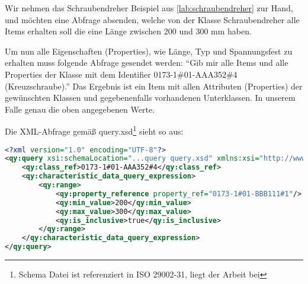 Wir nehmen das Schraubendreher Beispiel aus \autoref{lab:schraubendreher} zur Hand, und möchten eine Abfrage absenden, welche von der Klasse Schraubendreher alle Items erhalten soll die eine Länge zwischen 200 und 300 mm haben. 

Um nun alle Eigenschaften (Properties), wie Länge, Typ und Spannungsfest zu erhalten muss folgende Abfrage gesendet werden: 
\enquote{Gib mir alle Items und alle Properties der Klasse mit dem Identifier 0173-1\#01-AAA352\#4 (Kreuzschraube).}
Das Ergebnis ist ein Item mit allen Attributen (Properties) der gewünschten Klassen und gegebenenfalls vorhandenen Unterklassen. In unserem Falle genau die oben angegebenen Werte.

Die XML-Abfrage gemäß query.xsd\footnote{Schema Datei ist referenziert in ISO 29002-31, liegt der Arbeit bei} sieht so aus:

\begin{lstlisting}[caption=Query Beispiel - Daten mit Suchausdruck abfragen, language=XML, label=UseCaseDatenabfragenProperty]
<?xml version="1.0" encoding="UTF-8"?>
<qy:query xsi:schemaLocation="...query query.xsd" xmlns:xsi="http://www.w3.org/2001/XMLSchema-instance" xmlns:cat="...catalogue" xmlns:val="...value" xmlns:qy="...query" xmlns:bas="...basic">
	<qy:class_ref>0173-1#01-AAA352#4</qy:class_ref>
	<qy:characteristic_data_query_expression>
		<qy:range>
			<qy:property_reference property_ref="0173-1#01-BBB111#1"/>
			<qy:min_value>200</qy:min_value>
			<qy:max_value>300</qy:max_value>
			<qy:is_inclusive>true</qy:is_inclusive>
		</qy:range>
	</qy:characteristic_data_query_expression>
</qy:query>
\end{lstlisting}



